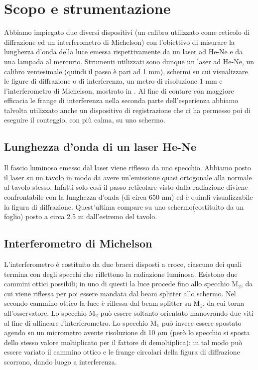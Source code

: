 \section{Scopo e strumentazione}

Abbiamo impiegato due diversi dispositivi (un calibro utilizzato come reticolo di diffrazione ed un interferometro di Michelson) con l'obiettivo di misurare la lunghezza d'onda della luce emessa rispettivamente da un laser ad He-Ne e da una lampada al mercurio. Strumenti utilizzati sono dunque un laser ad He-Ne, un calibro ventesimale (quindi il passo è pari ad 1 mm), schermi su cui visualizzare le figure di diffrazione o di interferenza, un metro di risoluzione 1 mm e l'interferometro di Michelson, mostrato in . Al fine di contare con maggiore efficacia le frange di interferenza nella seconda parte dell'esperienza abbiamo talvolta utilizzato anche un dispositivo di registrazione che ci ha permesso poi di eseguire il conteggio, con più calma, su uno schermo.\\
\subsection{Lunghezza d'onda di un laser He-Ne}
Il fascio luminoso emesso dal laser viene riflesso da uno specchio.
Abbiamo posto il laser su un tavolo in modo da avere un'emissione quasi ortogonale alla normale al tavolo stesso. Infatti solo così il passo reticolare visto dalla radiazione diviene confrontabile con la lunghezza d'onda (di circa 650 nm) ed è quindi visualizzabile la figura di diffrazione. Quest'ultima compare su uno schermo(costituito da un foglio) posto a circa 2.5 m dall'estremo del tavolo.\\
\subsection{Interferometro di Michelson}
L'interferometro è costituito da due bracci disposti a croce, ciascuno dei quali termina con degli specchi che riflettono la radiazione luminosa. Esistono due cammini ottici possibili; in uno di questi la luce procede fino allo specchio M$_2$, da cui viene riflessa per poi essere mandata dal beam splitter allo schermo. Nel secondo cammino ottico la luce è riflessa dal beam splitter su M$_1$, da cui torna all'osservatore. Lo specchio M$_2$ può essere soltanto orientato manovrando due viti al fine di allineare l'interferometro. Lo specchio M$_1$ può invece essere spostato agendo su un micrometro avente risoluzione di 10 $\mu$m (però lo specchio si sposta dello stesso valore moltiplicato per il fattore di demoltiplica): in tal modo può essere variato il cammino ottico e le frange circolari della figura di diffrazione scorrono, dando luogo a interferenza.

